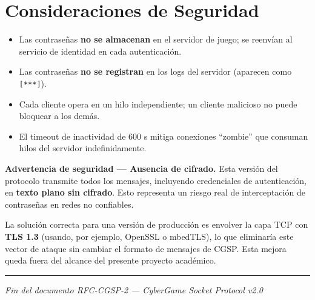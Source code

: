 \documentclass[12pt, letterpaper]{article}
\begin{document}
\section{Consideraciones de Seguridad}

\begin{itemize}[leftmargin=2em]
    \item Las contraseñas \textbf{no se almacenan} en el servidor de juego; se reenvían al
          servicio de identidad en cada autenticación.
    \item Las contraseñas \textbf{no se registran} en los logs del servidor (aparecen como
          \texttt{[***]}).
    \item Cada cliente opera en un hilo independiente; un cliente malicioso no puede
          bloquear a los demás.
        \item El timeout de inactividad de 600 s mitiga conexiones ``zombie'' que
          consuman hilos del servidor indefinidamente.
\end{itemize}

\begin{advertencia}
\textbf{Advertencia de seguridad --- Ausencia de cifrado.}
Esta versión del protocolo transmite todos los mensajes, incluyendo credenciales de
autenticación, en \textbf{texto plano sin cifrado}. Esto representa un riesgo real
de interceptación de contraseñas en redes no confiables.

La solución correcta para una versión de producción es envolver la capa TCP con
\textbf{TLS 1.3} (usando, por ejemplo, OpenSSL o mbedTLS), lo que eliminaría este
vector de ataque sin cambiar el formato de mensajes de CGSP. Esta mejora queda fuera
del alcance del presente proyecto académico.
\end{advertencia}

\vspace{2cm}
\hrule
\vspace{0.3cm}
{\small\centering\textit{Fin del documento RFC-CGSP-2 --- CyberGame Socket Protocol v2.0}\par}
\end{document}
